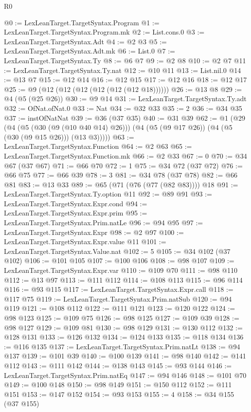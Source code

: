 \begin{lexlean}{R0}
\begin{coremodule}
@0 := LexLeanTarget.TargetSyntax.Program
@1 := LexLeanTarget.TargetSyntax.Program.mk
@2 := List.cons.{0}
@3 := LexLeanTarget.TargetSyntax.Adt
@4 := @2 @3
@5 := LexLeanTarget.TargetSyntax.Adt.mk
@6 := List.{0}
@7 := LexLeanTarget.TargetSyntax.Ty
@8 := @6 @7
@9 := @2 @8
@10 := @2 @7
@11 := LexLeanTarget.TargetSyntax.Ty.nat
@12 := @10 @11
@13 := List.nil.{0}
@14 := @13 @7
@15 := @12 @14
@16 := @12 @15
@17 := @12 @16
@18 := @12 @17
@25 := @9 (@12 (@12 (@12 (@12 (@12 (@12 @18))))))
@26 := @13 @8
@29 := @4 (@5 (@25 @26))
@30 := @9 @14
@31 := LexLeanTarget.TargetSyntax.Ty.adt
@32 := OfNat.ofNat.{0}
@33 := Nat
@34 := @32 @33
@35 := 2
@36 := @34 @35
@37 := instOfNatNat
@39 := @36 (@37 @35)
@40 := @31 @39
@62 := @1
    (@29
      (@4
        (@5 (@30 (@9 (@10 @40 @14) @26)))
        (@4 (@5 (@9 @17 @26)) (@4 (@5 (@30 (@9 @15 @26))) (@13 @3)))))
@63 := LexLeanTarget.TargetSyntax.Function
@64 := @2 @63
@65 := LexLeanTarget.TargetSyntax.Function.mk
@66 := @2 @33
@67 := 0
@70 := @34 @67 (@37 @67)
@71 := @66 @70
@72 := 1
@75 := @34 @72 (@37 @72)
@76 := @66 @75
@77 := @66 @39
@78 := 3
@81 := @34 @78 (@37 @78)
@82 := @66 @81
@83 := @13 @33
@89 := @65 (@71 (@76 (@77 (@82 @83)))) @18
@91 := LexLeanTarget.TargetSyntax.Ty.option @11
@92 := @89 @91
@93 := LexLeanTarget.TargetSyntax.Expr.cond
@94 := LexLeanTarget.TargetSyntax.Expr.prim
@95 := LexLeanTarget.TargetSyntax.Prim.natLe
@96 := @94 @95
@97 := LexLeanTarget.TargetSyntax.Expr
@98 := @2 @97
@100 := LexLeanTarget.TargetSyntax.Expr.value @11
@101 := LexLeanTarget.TargetSyntax.Value.nat
@102 := 5
@105 := @34 @102 (@37 @102)
@106 := @101 @105
@107 := @100 @106
@108 := @98 @107
@109 := LexLeanTarget.TargetSyntax.Expr.var
@110 := @109 @70
@111 := @98 @110
@112 := @13 @97
@113 := @111 @112
@114 := @108 @113
@115 := @96 @114
@116 := @93 @115
@117 := LexLeanTarget.TargetSyntax.Expr.call
@118 := @117 @75
@119 := LexLeanTarget.TargetSyntax.Prim.natSub
@120 := @94 @119
@121 := @108 @112
@122 := @111 @121
@123 := @120 @122
@124 := @98 @123
@125 := @109 @75
@126 := @98 @125
@127 := @109 @39
@128 := @98 @127
@129 := @109 @81
@130 := @98 @129
@131 := @130 @112
@132 := @128 @131
@133 := @126 @132
@134 := @124 @133
@135 := @118 @134
@136 := @116 @135
@137 := LexLeanTarget.TargetSyntax.Prim.natLt
@138 := @94 @137
@139 := @101 @39
@140 := @100 @139
@141 := @98 @140
@142 := @141 @112
@143 := @111 @142
@144 := @138 @143
@145 := @93 @144
@146 := LexLeanTarget.TargetSyntax.Prim.natEq
@147 := @94 @146
@148 := @101 @70
@149 := @100 @148
@150 := @98 @149
@151 := @150 @112
@152 := @111 @151
@153 := @147 @152
@154 := @93 @153
@155 := 4
@158 := @34 @155 (@37 @155)

\end{coremodule}
\end{lexlean}
